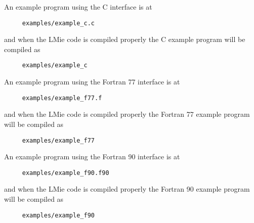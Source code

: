 An example program using the C interface is at
\begin{verbatim}
     examples/example_c.c
\end{verbatim}
and when the LMie code is compiled properly the C example program will be compiled as
\begin{verbatim}
     examples/example_c
\end{verbatim}


%
\label{lmie_fortran_77_interface_interface}

\label{lmie_fortran_77_interface_size_distributions}

\label{lmie_fortran_77_interface_function_interface}

\label{lmie_fortran_77_interface_example_fortran_77_program_using_lmie}

An example program using the Fortran 77 interface is at
\begin{verbatim}
     examples/example_f77.f
\end{verbatim}
and when the LMie code is compiled properly the Fortran 77 example program will be compiled as
\begin{verbatim}
     examples/example_f77
\end{verbatim}


%
\label{lmie_fortran_90_interface_interface}

\label{lmie_fortran_90_interface_size_distributions}

\label{lmie_fortran_90_interface_input_and_output_structures}

\label{lmie_fortran_90_interface_function_interface}

\label{lmie_fortran_90_interface_example_fortran_90_program_using_lmie}

An example program using the Fortran 90 interface is at
\begin{verbatim}
     examples/example_f90.f90
\end{verbatim}
and when the LMie code is compiled properly the Fortran 90 example program will be compiled as
\begin{verbatim}
     examples/example_f90
\end{verbatim}


